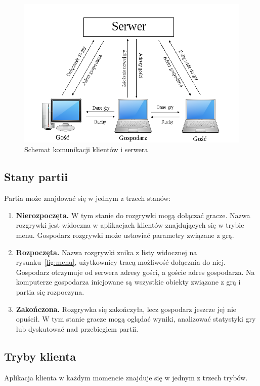 \documentclass[a4paper, 12pt]{article}
\begin{document}
\begin{figure}
\centering
\includegraphics[scale=0.6]{rysunki/arch.png}
\caption{Schemat komunikacji klientów i serwera}
\label{fig:arch}
\end{figure}

\subsection{Stany partii}
Partia może znajdować się w jednym z trzech stanów:
\begin{enumerate}
 \item \textbf{Nierozpoczęta.} W tym stanie do rozgrywki mogą dołączać gracze. Nazwa rozgrywki jest widoczna w aplikacjach klientów znajdujących się w trybie menu. Gospodarz rozgrywki może ustawiać parametry związane z grą. 

 \item \textbf{Rozpoczęta.} Nazwa rozgrywki znika z listy widocznej na rysunku~\ref{fig:menu}, użytkownicy tracą możliwość dołącznia do niej. Gospodarz otrzymuje od serwera adresy gości, a goście adres gospodarza. Na komputerze gospodarza inicjowane są wszystkie obiekty związane z grą i partia się rozpoczyna.

 \item \textbf{Zakończona.} Rozgrywka się zakończyła, lecz gospodarz jeszcze jej nie opuścił. W tym stanie gracze mogą oglądać wyniki, analizować statystyki gry lub dyskutować nad przebiegiem partii.
\end{enumerate}

\subsection{Tryby klienta}
Aplikacja klienta w każdym momencie znajduje się w jednym z trzech trybów.
\end{document}
